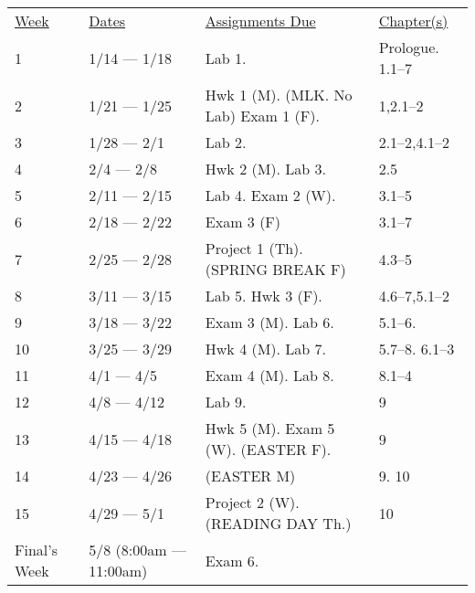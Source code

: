 \documentclass[10pt]{article}
\begin{document}
\begin{center}
\begin{tabular}{llll}
\underline{Week} & \underline{Dates} & \underline{Assignments Due} & \underline{Chapter(s)}\\
1 & 1/14 --- 1/18 & Lab 1.  &  Prologue. 1.1--7\\
2 & 1/21 --- 1/25 &  Hwk 1 (M). (MLK. No Lab) Exam 1 (F). &  1,2.1--2 \\
3 & 1/28 --- 2/1 & Lab 2. &  2.1--2,4.1--2 \\
4 & 2/4 --- 2/8 & Hwk 2 (M). Lab 3. & 2.5 \\
5 & 2/11 --- 2/15 & Lab 4. Exam 2 (W). & 3.1--5\\
6 & 2/18 --- 2/22 & Exam 3 (F) & 3.1--7\\
7 & 2/25 --- 2/28 & Project 1 (Th). (SPRING BREAK F) & 4.3--5  \\
8 & 3/11 --- 3/15 & Lab 5. Hwk 3 (F). & 4.6--7,5.1--2 \\
9 & 3/18 --- 3/22 & Exam 3 (M). Lab 6.  & 5.1--6. \\
10 & 3/25 --- 3/29 & Hwk 4 (M). Lab 7.  & 5.7--8. 6.1--3 \\
11 & 4/1 --- 4/5 &  Exam 4 (M). Lab 8. & 8.1--4 \\
12 & 4/8 --- 4/12 &  Lab 9. & 9 \\
13 & 4/15 --- 4/18 & Hwk 5 (M). Exam 5 (W). (EASTER F).&  9 \\
14 & 4/23 --- 4/26 & (EASTER M) & 9. 10 \\
15 & 4/29 --- 5/1 & Project 2 (W). (READING DAY Th.)  & 10 \\
Final's Week & 5/8 (8:00am --- 11:00am) & Exam 6.  &  \\
\end{tabular}
\end{center}
\end{document}
